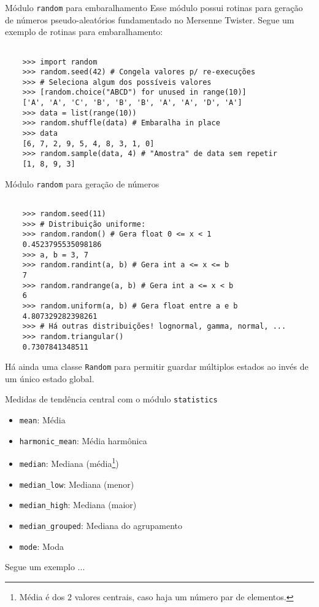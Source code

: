 \documentclass[utf8]{beamer}
\begin{document}
\begin{frame}[fragile]{Módulo \texttt{random} para embaralhamento}
  Esse módulo possui rotinas para geração de números pseudo-aleatórios
  fundamentado no Mersenne Twister.
  Segue um exemplo de rotinas para embaralhamento:

  \begin{verbatim}

    >>> import random
    >>> random.seed(42) # Congela valores p/ re-execuções
    >>> # Seleciona algum dos possíveis valores
    >>> [random.choice("ABCD") for unused in range(10)]
    ['A', 'A', 'C', 'B', 'B', 'B', 'A', 'A', 'D', 'A']
    >>> data = list(range(10))
    >>> random.shuffle(data) # Embaralha in place
    >>> data
    [6, 7, 2, 9, 5, 4, 8, 3, 1, 0]
    >>> random.sample(data, 4) # "Amostra" de data sem repetir
    [1, 8, 9, 3]

  \end{verbatim}

\end{frame}


\begin{frame}[fragile]{Módulo \texttt{random} para geração de números}
  \begin{verbatim}

    >>> random.seed(11)
    >>> # Distribuição uniforme:
    >>> random.random() # Gera float 0 <= x < 1
    0.4523795535098186
    >>> a, b = 3, 7
    >>> random.randint(a, b) # Gera int a <= x <= b
    7
    >>> random.randrange(a, b) # Gera int a <= x < b
    6
    >>> random.uniform(a, b) # Gera float entre a e b
    4.807329282398261
    >>> # Há outras distribuições! lognormal, gamma, normal, ...
    >>> random.triangular()
    0.7307841348511

  \end{verbatim}

  Há ainda uma classe \texttt{Random} para permitir
  guardar múltiplos estados ao invés de um único estado global.
\end{frame}


\begin{frame}{Medidas de tendência central
              com o módulo \texttt{statistics}}
  \begin{itemize}
    \item \texttt{mean}: Média
    \item \texttt{harmonic_mean}: Média harmônica
    \item \texttt{median}: Mediana (média\footnote{
      Média é dos $2$ valores centrais,
      caso haja um número par de elementos.
    })
    \item \texttt{median_low}: Mediana (menor)
    \item \texttt{median_high}: Mediana (maior)
    \item \texttt{median_grouped}: Mediana do agrupamento
    \item \texttt{mode}: Moda
  \end{itemize}

  Segue um exemplo ...

\end{frame}
\end{document}

